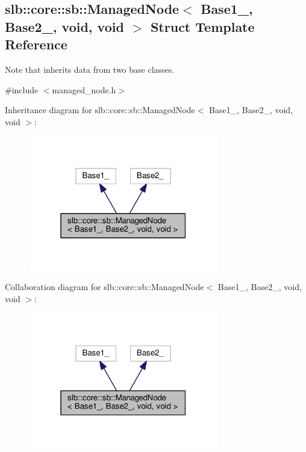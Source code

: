 \hypertarget{structslb_1_1core_1_1sb_1_1ManagedNode_3_01Base1___00_01Base2___00_01void_00_01void_01_4}{}\subsection{slb\+:\+:core\+:\+:sb\+:\+:Managed\+Node$<$ Base1\+\_\+, Base2\+\_\+, void, void $>$ Struct Template Reference}
\label{structslb_1_1core_1_1sb_1_1ManagedNode_3_01Base1___00_01Base2___00_01void_00_01void_01_4}


Note that inherits data from two base classes.  




{\ttfamily \#include $<$managed\+\_\+node.\+h$>$}



Inheritance diagram for slb\+:\+:core\+:\+:sb\+:\+:Managed\+Node$<$ Base1\+\_\+, Base2\+\_\+, void, void $>$\+:\nopagebreak
\begin{figure}[H]
\begin{center}
\leavevmode
\includegraphics[width=235pt]{structslb_1_1core_1_1sb_1_1ManagedNode_3_01Base1___00_01Base2___00_01void_00_01void_01_4__inherit__graph}
\end{center}
\end{figure}


Collaboration diagram for slb\+:\+:core\+:\+:sb\+:\+:Managed\+Node$<$ Base1\+\_\+, Base2\+\_\+, void, void $>$\+:\nopagebreak
\begin{figure}[H]
\begin{center}
\leavevmode
\includegraphics[width=235pt]{structslb_1_1core_1_1sb_1_1ManagedNode_3_01Base1___00_01Base2___00_01void_00_01void_01_4__coll__graph}
\end{center}
\end{figure}
